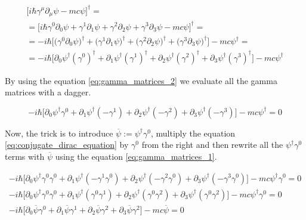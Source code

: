 \begin{equation*}
    \begin{gathered}
        \big[i \hbar \gamma^{\mu} \partial_{\mu} \psi - mc \psi\big]^{\dagger} = \\
        = \big[i \hbar \gamma^{0} \partial_{0} \psi + \gamma^{1} \partial_{1} \psi + \gamma^{2} \partial_{2} \psi + \gamma^{3} \partial_{3} \psi - mc \psi\big]^{\dagger} = \\
        = - i \hbar \big[\big(\gamma^{0} \partial_{0} \psi\big)^{\dagger} + \big(\gamma^{1} \partial_{1} \psi\big)^{\dagger} + 
            \big(\gamma^{2} \partial_{2} \psi\big)^{\dagger} + \big(\gamma^{3} \partial_{3} \psi \big)^{\dagger}\big] - mc \psi^{\dagger} = \\
        = - i \hbar \big[ \partial_{0} \psi^{\dagger} (\gamma^{0})^{\dagger} + \partial_{1} \psi^{\dagger} (\gamma^{1})^{\dagger} + \partial_{2} \psi^{\dagger} (\gamma^{2})^{\dagger}
            + \partial_{3} \psi^{\dagger} (\gamma^{3})^{\dagger} \big] - mc \psi^{\dagger}
    \end{gathered}
\end{equation*}

By using the equation \ref{eq:gamma_matrices_2} we evaluate all the gamma matrices with a dagger.

\begin{equation}
    \label{eq:conjugate_dirac_equation}
    - i \hbar \big[ \partial_{0} \psi^{\dagger} \gamma^{0} + \partial_{1} \psi^{\dagger} (- \gamma^{1}) + \partial_{2} \psi^{\dagger} (-\gamma^{2})
        + \partial_{3} \psi^{\dagger} (-\gamma^{3}) \big] - mc \psi^{\dagger} = 0
\end{equation}

Now, the trick is to introduce $\overline{\psi} := \psi^{\dagger} \gamma^{0}$, multiply the equation \ref{eq:conjugate_dirac_equation} by 
$\gamma^{0}$ from the right and then rewrite all the $\psi^{\dagger} \gamma^{0}$ terms with $\overline{\psi}$ using the equation \ref{eq:gamma_matrices_1}.

\begin{equation*}
    \begin{gathered}
        - i \hbar \big[ \partial_{0} \psi^{\dagger} \gamma^{0} \gamma^{0} + \partial_{1} \psi^{\dagger} (- \gamma^{1} \gamma^{0}) + \partial_{2} \psi^{\dagger} (-\gamma^{2} \gamma^{0})
            + \partial_{3} \psi^{\dagger} (-\gamma^{3} \gamma^{0}) \big] - mc \psi^{\dagger} \gamma^{0} = 0 \\
        - i \hbar \big[ \partial_{0} \psi^{\dagger} \gamma^{0} \gamma^{0} + \partial_{1} \psi^{\dagger} (\gamma^{0} \gamma^{1}) + \partial_{2} \psi^{\dagger} (\gamma^{0} \gamma^{2})
            + \partial_{3} \psi^{\dagger} (\gamma^{0} \gamma^{2}) \big] - mc \psi^{\dagger} \gamma^{0} = 0 \\
        - i \hbar \big[ \partial_{0} \overline{\psi} \gamma^{0} + \partial_{1} \overline{\psi} \gamma^{1} + \partial_{2} \overline{\psi} \gamma^{2}
            + \partial_{3} \overline{\psi} \gamma^{2} \big] - mc \overline{\psi} = 0 \\
    \end{gathered}
\end{equation*}

